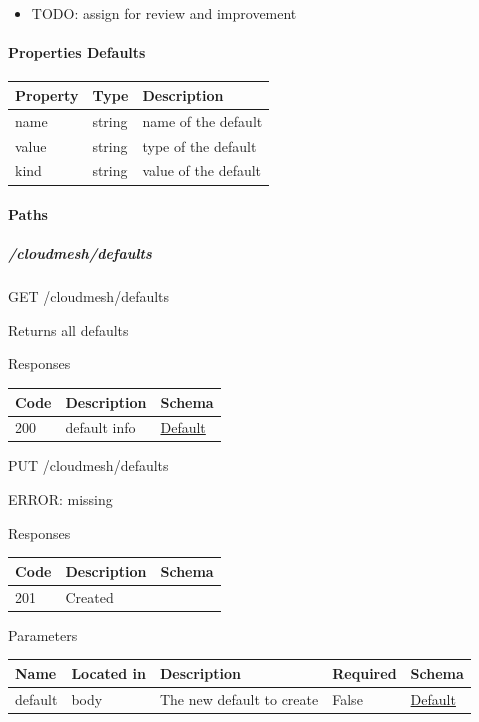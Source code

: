 \documentclass[9pt,]{article}
\providecommand{\tightlist}{%
  \setlength{\itemsep}{0pt}\setlength{\parskip}{0pt}}
\let\oldparagraph\paragraph
\renewcommand{\paragraph}[1]{\oldparagraph{#1}\mbox{}}
\let\oldsubparagraph\subparagraph
\renewcommand{\subparagraph}[1]{\oldsubparagraph{#1}\mbox{}}
\begin{document}
\begin{itemize}
\tightlist
\item
  TODO: assign for review and improvement
\end{itemize}

\hypertarget{properties-defaults}{%
\paragraph{Properties Defaults}\label{properties-defaults}}

\begin{longtable}[]{@{}lll@{}}
\toprule
Property & Type & Description\tabularnewline
\midrule
\endhead
name & string & name of the default\tabularnewline
value & string & type of the default\tabularnewline
kind & string & value of the default\tabularnewline
\bottomrule
\end{longtable}

\hypertarget{paths-6}{%
\paragraph{Paths}\label{paths-6}}

\hypertarget{cloudmeshdefaults}{%
\subparagraph{/cloudmesh/defaults}\label{cloudmeshdefaults}}

GET /cloudmesh/defaults

Returns all defaults

Responses

\begin{longtable}[]{@{}lll@{}}
\toprule
Code & Description & Schema\tabularnewline
\midrule
\endhead
200 & default info & \protect\hyperlink{default}{Default}\tabularnewline
\bottomrule
\end{longtable}

PUT /cloudmesh/defaults

ERROR: missing

Responses

\begin{longtable}[]{@{}lll@{}}
\toprule
Code & Description & Schema\tabularnewline
\midrule
\endhead
201 & Created &\tabularnewline
\bottomrule
\end{longtable}

Parameters

\begin{longtable}[]{@{}lllll@{}}
\toprule
Name & Located in & Description & Required & Schema\tabularnewline
\midrule
\endhead
default & body & The new default to create & False &
\protect\hyperlink{default}{Default}\tabularnewline
\bottomrule
\end{longtable}
\end{document}
